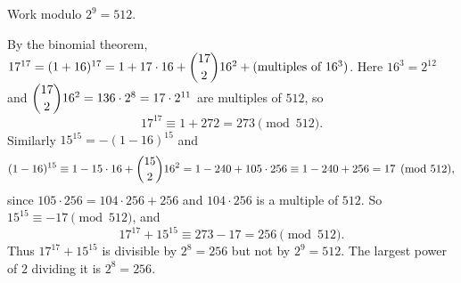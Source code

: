 Work modulo $2^9=512$.

By the binomial theorem, $17^{17}=(1+16)^{17}=1+17\cdot16+\dbinom{17}{2}16^2+(\text{multiples of }16^3)$. Here $16^3=2^{12}$ and $\dbinom{17}{2}16^2=136\cdot2^8=17\cdot2^{11}$ are multiples of $512$, so
\[17^{17}\equiv1+272=273\pmod{512}.\]
Similarly $15^{15}=-(1-16)^{15}$ and
\[(1-16)^{15}\equiv1-15\cdot16+\dbinom{15}{2}16^2=1-240+105\cdot256\equiv1-240+256=17\pmod{512},\]
since $105\cdot256=104\cdot256+256$ and $104\cdot256$ is a multiple of $512$. So $15^{15}\equiv-17\pmod{512}$, and
\[17^{17}+15^{15}\equiv273-17=256\pmod{512}.\]
Thus $17^{17}+15^{15}$ is divisible by $2^8=256$ but not by $2^9=512$. The largest power of $2$ dividing it is $\boxed{2^8=256}$.
